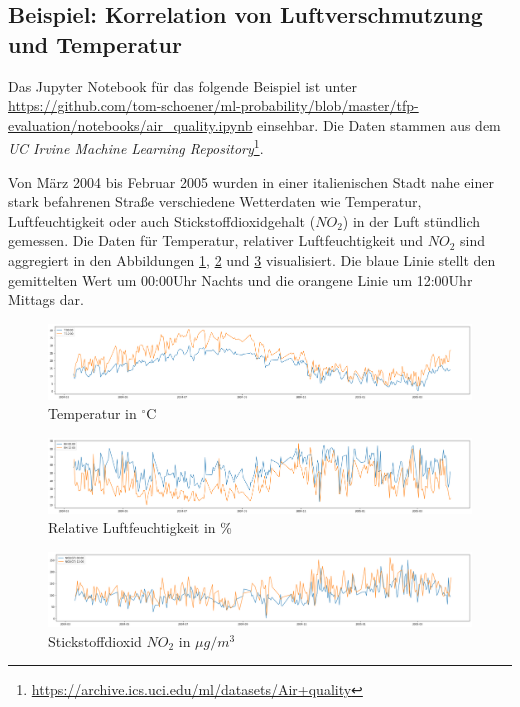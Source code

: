 \documentclass[12pt]{article}
\begin{document}
\subsection{Beispiel: Korrelation von Luftverschmutzung und Temperatur}
\label{sec:example_air_quality}

Das Jupyter Notebook für das folgende Beispiel ist unter \url{https://github.com/tom-schoener/ml-probability/blob/master/tfp-evaluation/notebooks/air_quality.ipynb} einsehbar. Die Daten stammen aus dem \textit{UC Irvine Machine Learning Repository}\footnote{\url{https://archive.ics.uci.edu/ml/datasets/Air+quality}}.

Von März 2004 bis Februar 2005 wurden in einer italienischen Stadt nahe einer stark befahrenen Straße verschiedene Wetterdaten wie Temperatur, Luftfeuchtigkeit oder auch Stickstoffdioxidgehalt ($NO_2$) in der Luft stündlich gemessen. Die Daten für Temperatur, relativer Luftfeuchtigkeit und $NO_2$ sind aggregiert in den Abbildungen \ref{fig:temp}, \ref{fig:rh} und \ref{fig:no2} visualisiert. Die blaue Linie stellt den gemittelten Wert um 00:00Uhr Nachts und die orangene Linie um 12:00Uhr Mittags dar.

\begin{figure}[h]
    \centering
    \includegraphics[width=1.0\textwidth]{./figs/temp.png}
    \caption{Temperatur in $^\circ\text{C}$}
    \label{fig:temp}
\end{figure}

\begin{figure}[h]
    \centering
    \includegraphics[width=1.0\textwidth]{./figs/rh.png}
    \caption{Relative Luftfeuchtigkeit in \%}
    \label{fig:rh}
\end{figure}

\begin{figure}[h]
    \centering
    \includegraphics[width=1.0\textwidth]{./figs/no2.png}
    \caption{Stickstoffdioxid $NO_2$ in ${\mu g/m^3}$}
    \label{fig:no2}
\end{figure}
\end{document}
